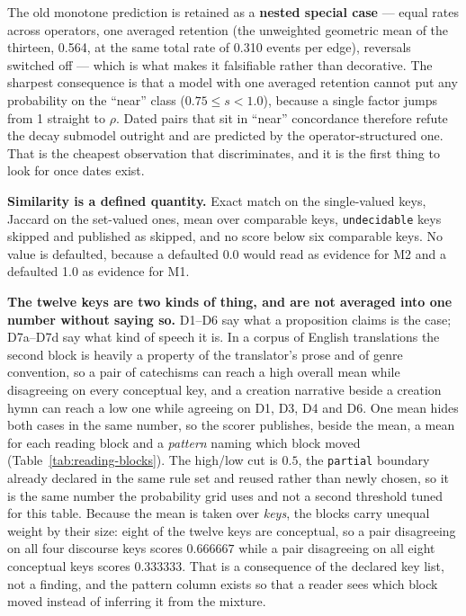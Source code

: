 \documentclass[11pt]{article}
\DeclareRobustCommand{\_}{\textunderscore\allowbreak}
\newcommand{\field}[1]{\texttt{\small #1}}
\begin{document}
The old monotone prediction is retained as a \textbf{nested special case} ---
equal rates across operators, one averaged retention (the unweighted geometric
mean of the thirteen, 0.564, at the same total rate of 0.310 events per edge),
reversals switched off --- which is what makes it falsifiable rather than
decorative. The sharpest consequence is that a model with one averaged retention
cannot put any probability on the ``near'' class (\(0.75 \le s < 1.0\)), because a
single factor jumps from 1 straight to \(\rho\). Dated pairs that sit in ``near''
concordance therefore refute the decay submodel outright and are predicted by the
operator-structured one. That is the cheapest observation that discriminates, and
it is the first thing to look for once dates exist.

\textbf{Similarity is a defined quantity.} Exact match on the single-valued keys,
Jaccard on the set-valued ones, mean over comparable keys, \field{undecidable}
keys skipped and published as skipped, and no score below six comparable keys. No
value is defaulted, because a defaulted 0.0 would read as evidence for M2 and a
defaulted 1.0 as evidence for M1.

\textbf{The twelve keys are two kinds of thing, and are not averaged into one
number without saying so.} D1--D6 say what a proposition claims is the case;
D7a--D7d say what kind of speech it is. In a corpus of English translations the
second block is heavily a property of the translator's prose and of genre
convention, so a pair of catechisms can reach a high overall mean while
disagreeing on every conceptual key, and a creation narrative beside a creation
hymn can reach a low one while agreeing on D1, D3, D4 and D6. One mean hides
both cases in the same number, so the scorer publishes, beside the mean, a mean
for each reading block and a \emph{pattern} naming which block moved
(Table~\ref{tab:reading-blocks}). The high/low cut is \(0.5\), the \field{partial}
boundary already declared in the same rule set and reused rather than newly
chosen, so it is the same number the probability grid uses and not a second
threshold tuned for this table. Because the mean is taken over \emph{keys}, the
blocks carry unequal weight by their size: eight of the twelve keys are
conceptual, so a pair disagreeing on all four discourse keys scores \(0.666667\)
while a pair disagreeing on all eight conceptual keys scores \(0.333333\). That
is a consequence of the declared key list, not a finding, and the pattern column
exists so that a reader sees which block moved instead of inferring it from the
mixture.
\end{document}
